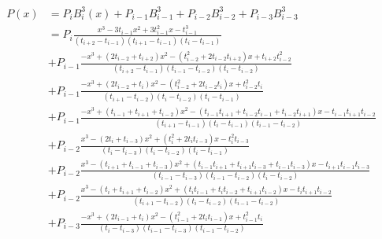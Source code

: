 \documentclass[]{article}
\begin{document}
\begin{align*}
	P(x) &= P_iB_i^3(x) + P_{i-1}B_{i-1}^3 + P_{i-2}B_{i-2}^3 + P_{i-3}B_{i-3}^3 \\
	&= P_i\frac{x^3 - 3t_{i-1}x^2 + 3t_{i-1}^2x - t_{i-1}^3}  {(t_{i+2} - t_{i-1})(t_{i+1} - t_{i-1})(t_i - t_{i-1})} \\
	&+ P_{i-1}\frac{-x^3 + (2t_{i-2}+t_{i+2})x^2 - (t_{i-2}^2+2t_{i-2}t_{i+2})x + t_{i+2}t_{i-2}^2}  {(t_{i+2} - t_{i-1})(t_{i-1} - t_{i-2})(t_i - t_{i-2})} \\
	&+ P_{i-1}\frac{-x^3 + (2t_{i-2}+t_i)x^2 - (t_{i-2}^2+2t_{i-2}t_i)x + t_{i-2}^2t_i}  {(t_{i+1} - t_{i-2})(t_i - t_{i-2})(t_i-t_{i-1})} \\
	&+ P_{i-1}\frac{-x^3 + (t_{i-1}+t_{i+1}+t_{i-2})x^2 - (t_{i-1}t_{i+1}+t_{i-2}t_{i-1}+t_{i-2}t_{i+1})x-t_{i-1}t_{i+1}t_{i-2}}  {(t_{i+1}-t_{i-1})(t_i-t_{i-1})(t_{i-1}-t_{i-2})} \\
	&+ P_{i-2}\frac{x^3 - (2t_i+t_{i-3})x^2 + (t_i^2+2t_it_{i-3})x - t_i^2t_{i-3}}{(t_i-t_{i-3})(t_i-t_{i-2})(t_i-t_{i-1})} \\
	&+ P_{i-2}\frac{x^3 - (t_{i+1}+t_{i-1}+t_{i-3})x^2 + (t_{i-1}t_{i+1}+t_{i+1}t_{i-3}+t_{i-1}t_{i-3})x - t_{i+1}t_{i-1}t_{i-3}}  {(t_{i-1}-t_{i-3})(t_{i-1}-t_{i-2})(t_i-t_{i-2})} \\
	&+ P_{i-2}\frac{x^3 - (t_i+t_{i+1}+t_{i-2})x^2 + (t_it_{i-1}+t_it_{i-2}+t_{i+1}t_{i-2})x - t_it_{i+1}t_{i-2}}  {(t_{i+1}-t_{i-2})(t_i-t_{i-2})(t_{i-1}-t_{i-2})} \\
	&+ P_{i-3}\frac{-x^3 + (2t_{i-1}+t_i)x^2 - (t_{i-1}^2+2t_it_{i-1})x + t_{i-1}^2t_i}  {(t_i-t_{i-3})(t_{i-1}-t_{i-3})(t_{i-1}-t_{i-2})}
\end{align*}


	
\begin{comment}
\begin{TeXtoEPS}

\begin{tikzpicture}
\node[circle,draw,fill=yellow](n4) at (0,0)
	{$\gamma_4^+$};
\node[circle,draw](n6) at (-2,-2) {$\gamma_6^-$}; 
\node[circle,draw](n5) at (0,-2) {$\gamma_5^-$}; 
\node[circle,draw](n7) at (2,-2) {$\gamma_7^-$}; 
\node[circle,draw,fill=yellow](n2) at (-1,-4) {$\gamma_2^+$}; 
\node[circle,draw,fill=yellow](n3) at (+1,-4) {$\gamma_3^+$}; 
\node[circle,draw,fill=yellow](n1) at (-4,0) {$\gamma_1^+$}; 
\draw[line width=2] (n4)--(n6); 
\draw[line width=2] (n4)--(n5); 
\draw[line width=2] (n4)--(n7); 
\draw (n5)--(n2); \draw (n5)--(n3);
\end{tikzpicture}


\end{TeXtoEPS}
\end{comment}
\end{document}
